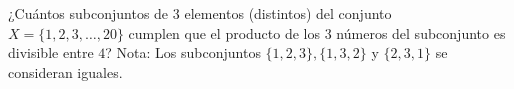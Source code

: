 ¿Cuántos subconjuntos de $3$ elementos (distintos) del conjunto $X = \{1, 2, 3, \dots , 20\}$ cumplen que el producto de los $3$ números del subconjunto es divisible entre $4$? Nota: Los subconjuntos $\{1, 2, 3\}, \{1, 3, 2\}$ y $\{2, 3, 1\}$ se consideran iguales.